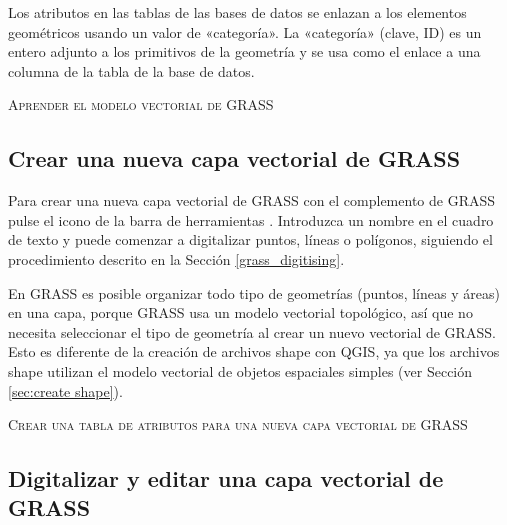 Los atributos en las tablas de las bases de datos se enlazan a los elementos geométricos usando un valor de «categoría».
 La «categoría» (clave, ID) es un entero adjunto a los primitivos de la geometría y se 
usa como el enlace a una columna de la tabla de la base de datos.

\begin{Tip}\caption{\textsc{Aprender el modelo vectorial de GRASS}}
\end{Tip} 

\subsection{Crear una nueva capa vectorial de GRASS}\label{sec:creating_new_grass_vectors}

Para crear una nueva capa vectorial de GRASS con el complemento de GRASS pulse el icono de la barra de herramientas 
. Introduzca un nombre en el cuadro de texto y puede comenzar 
a digitalizar puntos, líneas o polígonos, siguiendo el procedimiento descrito en la Sección 
\ref{grass_digitising}. 

En GRASS es posible organizar todo tipo de geometrías (puntos, líneas y áreas) en una capa, porque GRASS usa un modelo
vectorial topológico, así que no necesita seleccionar el tipo de geometría al crear un nuevo vectorial de GRASS. Esto es
diferente de la creación de archivos shape con QGIS, ya que los archivos shape utilizan el modelo vectorial de objetos 
espaciales simples (ver Sección \ref{sec:create shape}).

\begin{Tip}\caption{\textsc{Crear una tabla de atributos para una nueva capa vectorial de GRASS}}
\end{Tip} 

\subsection{Digitalizar y editar una capa vectorial de GRASS}\label{grass_digitising}

